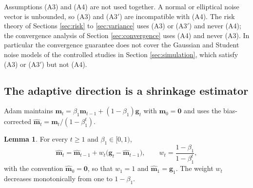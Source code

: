 \documentclass[a4paper,fleqn]{cas-dc}
\theoremstyle{plain}
\theoremstyle{definition}
\newtheorem{lemma}{Lemma}
\theoremstyle{remark}
\newenvironment{revblock}{}{}
\begin{document}
Assumptions (A3) and (A4) are not used together. A normal or elliptical noise vector is unbounded, so (A3) and (A3$'$) are incompatible with (A4). The risk theory of Sections \ref{sec:risk} to \ref{sec:variance} uses (A3) or (A3$'$) and never (A4); the convergence analysis of Section \ref{sec:convergence} uses (A4) and never (A3). In particular the convergence guarantee does not cover the Gaussian and Student noise models of the controlled studies in Section \ref{sec:simulation}, which satisfy (A3) or (A3$'$) but not (A4).

\subsection{The adaptive direction is a shrinkage estimator}

Adam maintains $\bm m_t=\beta_1\bm m_{t-1}+(1-\beta_1)\bm g_t$ with $\bm m_0=\bm 0$ and uses the bias-corrected $\hat{\bm m}_t=\bm m_t/(1-\beta_1^{t})$.

\begin{lemma}
\label{lem:adam_identity}
For every $t\ge1$ and $\beta_1\in[0,1)$,
\begin{equation}
\hat{\bm m}_t=\hat{\bm m}_{t-1}+w_t\bigl(\bm g_t-\hat{\bm m}_{t-1}\bigr),
\qquad
w_t=\frac{1-\beta_1}{1-\beta_1^{t}},
\end{equation}
with the convention $\hat{\bm m}_0=\bm 0$, so that $w_1=1$ and $\hat{\bm m}_1=\bm g_1$. The weight $w_t$ decreases monotonically from one to $1-\beta_1$.
\end{lemma}
\end{document}
